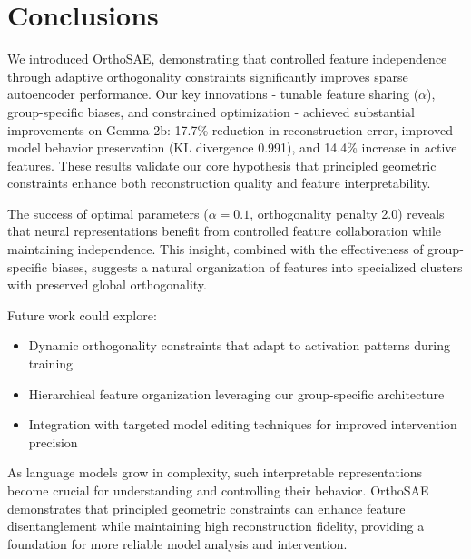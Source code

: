 \documentclass{article} %
\begin{document}
\section{Conclusions}
\label{sec:conclusion}

We introduced OrthoSAE, demonstrating that controlled feature independence through adaptive orthogonality constraints significantly improves sparse autoencoder performance. Our key innovations - tunable feature sharing ($\alpha$), group-specific biases, and constrained optimization - achieved substantial improvements on Gemma-2b: 17.7\% reduction in reconstruction error, improved model behavior preservation (KL divergence 0.991), and 14.4\% increase in active features. These results validate our core hypothesis that principled geometric constraints enhance both reconstruction quality and feature interpretability.

The success of optimal parameters ($\alpha=0.1$, orthogonality penalty 2.0) reveals that neural representations benefit from controlled feature collaboration while maintaining independence. This insight, combined with the effectiveness of group-specific biases, suggests a natural organization of features into specialized clusters with preserved global orthogonality.

Future work could explore:
\begin{itemize}
    \item Dynamic orthogonality constraints that adapt to activation patterns during training
    \item Hierarchical feature organization leveraging our group-specific architecture
    \item Integration with targeted model editing techniques for improved intervention precision
\end{itemize}

As language models grow in complexity, such interpretable representations become crucial for understanding and controlling their behavior. OrthoSAE demonstrates that principled geometric constraints can enhance feature disentanglement while maintaining high reconstruction fidelity, providing a foundation for more reliable model analysis and intervention.



\end{document}
